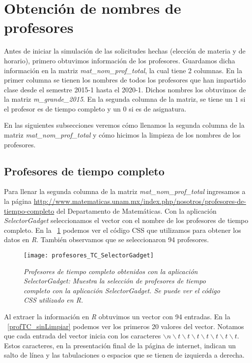 \section{Obtención de nombres de profesores} \label{nomProfesores}

Antes de iniciar la simulación de las solicitudes hechas (elección de materia y de horario), primero obtuvimos información de los profesores. Guardamos dicha información en la matriz \textit{mat\_nom\_prof\_total}, la cual tiene 2 columnas. En la primer columna se tienen los nombres de todos los profesores que han impartido clase desde el semestre 2015-1 hasta el 2020-1. Dichos nombres los obtuvimos de la matriz \textit{m\_grande\_2015}. En la segunda columna de la matriz, se tiene un $1$ si el profesor es de tiempo completo y un $0$ si es de asignatura.

En las siguientes subsecciones veremos cómo llenamos la segunda columna de la matriz \textit{mat\_nom\_prof\_total} y cómo hicimos la limpieza de los nombres de los profesores.

\subsection{Profesores de tiempo completo}

Para llenar la segunda columna de la matriz \textit{mat\_nom\_prof\_total} ingresamos a la página \url{http://www.matematicas.unam.mx/index.php/nosotros/profesores-de-tiempo-completo} del Departamento de Matemáticas. Con la aplicación \textit{SelectorGadget} seleccionamos el vector con el nombre de los profesores de tiempo completo. En la \figurename{~\ref{profTC_SelectorGadget}} podemos ver el código CSS que utilizamos para obtener los datos en \textit{R}. También observamos que se seleccionaron 94 profesores.

\begin{figure}[H]
\centering
\texttt{[image: profesores\_TC\_SelectorGadget]} %
\caption[\textit{Profesores de tiempo completo: SelectorGadget}]{\textit{Profesores de tiempo completo obtenidos con la aplicación SelectorGadget: Muestra la selección de profesores de tiempo completo con la aplicación SelectorGadget. Se puede ver el código CSS utilizado en R.}}\label{profTC_SelectorGadget}
\end{figure}

Al extraer la información en \textit{R} obtuvimos un vector con 94 entradas. En la \figurename{~\ref{profTC_sinLimpiar}} podemos ver los primeros 20 valores del vector. Notamos que cada entrada del vector inicia con los caracteres $\backslash n \backslash t \backslash t \backslash t \backslash t \backslash t \backslash t \backslash t$. Estos caracteres, en la presentación final de la página de internet, indican un salto de línea y las tabulaciones o espacios que se tienen de izquierda a derecha.

